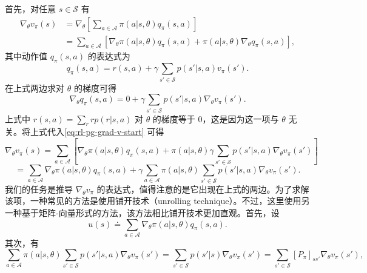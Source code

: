 \begin{note}
\label{box:rl-pg-9-2}
首先，对任意 $s \in \mathcal{S}$ 有
\begin{equation}
\begin{aligned}
\nabla_{\theta} v_{\pi}(s) &= \nabla_{\theta} \left[ \sum_{a \in \mathcal{A}} \pi(a|s,\theta) q_{\pi}(s,a) \right] \\
&= \sum_{a \in \mathcal{A}} \left[ \nabla_{\theta} \pi(a|s,\theta) q_{\pi}(s,a) + \pi(a|s,\theta) \nabla_{\theta} q_{\pi}(s,a) \right],
\end{aligned}
\label{eq:rl-pg-grad-v-start}
\end{equation}
其中动作值 $q_{\pi}(s,a)$ 的表达式为
\begin{equation}
q_{\pi}(s,a) = r(s,a) + \gamma \sum_{s' \in \mathcal{S}} p(s'|s,a) v_{\pi}(s').
\end{equation}
在上式两边求对 $\theta$ 的梯度可得
\begin{equation}
\nabla_{\theta} q_{\pi}(s,a) = 0 + \gamma \sum_{s' \in \mathcal{S}} p(s'|s,a) \nabla_{\theta} v_{\pi}(s').
\end{equation}
上式中 $r(s,a) = \sum_r r p(r|s,a)$ 对 $\theta$ 的梯度等于 0，这是因为这一项与 $\theta$ 无关。将上式代入\cref{eq:rl-pg-grad-v-start} 可得
\begin{equation}
\nabla_{\theta} v_{\pi}(s) = \sum_{a \in \mathcal{A}} \left[ \nabla_{\theta} \pi(a|s,\theta) q_{\pi}(s,a) + \pi(a|s,\theta) \gamma \sum_{s' \in \mathcal{S}} p(s'|s,a) \nabla_{\theta} v_{\pi}(s') \right]
\end{equation}
\begin{equation}
= \sum_{a \in \mathcal{A}} \nabla_{\theta} \pi(a|s,\theta) q_{\pi}(s,a) + \gamma \sum_{a \in \mathcal{A}} \pi(a|s,\theta) \sum_{s' \in \mathcal{S}} p(s'|s,a) \nabla_{\theta} v_{\pi}(s').
\label{eq:rl-pg-grad-v-rec}
\end{equation}
我们的任务是推导 $\nabla_{\theta}v_{\pi}$ 的表达式，值得注意的是它出现在上式的两边。为了求解该项，一种常见的方法是使用铺开技术（unrolling technique）。不过，这里使用另一种基于矩阵-向量形式的方法，该方法相比铺开技术更加直观。首先，设
\begin{equation}
u(s) \doteq \sum_{a \in \mathcal{A}} \nabla_{\theta} \pi(a|s,\theta) q_{\pi}(s,a).
\end{equation}
其次，有
\begin{equation}
\sum_{a \in \mathcal{A}} \pi(a|s,\theta) \sum_{s' \in \mathcal{S}} p(s'|s,a) \nabla_{\theta} v_{\pi}(s') = \sum_{s' \in \mathcal{S}} p(s'|s) \nabla_{\theta} v_{\pi}(s') = \sum_{s' \in \mathcal{S}} [P_{\pi}]_{ss'} \nabla_{\theta} v_{\pi}(s'),

\end{equation}
\end{note}
